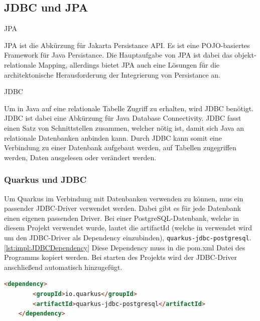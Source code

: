  
\subsection{JDBC und JPA}



\begin{compactitem}
    \item [JPA]
    \item JPA ist die Abkürzung für Jakarta Persistance API. Es ist eine POJO-basiertes Framework für Java Persistance. Die Hauptaufgabe von JPA ist dabei das objekt-relationale Mapping, allerdings bietet JPA auch eine Lösungen für die architektonische Herausforderung der Integrierung von Persistance an. 
    \item [JDBC]
    \item Um in Java auf eine relationale Tabelle Zugriff zu erhalten, wird JDBC benötigt. JDBC ist dabei eine Abkürzung für Java Database Connectivity. JDBC fasst einen Satz von Schnittstellen zusammen, welcher nötig ist, damit sich Java an relationale Datenbanken anbinden kann. Durch JDBC kann somit eine Verbindung zu einer Datenbank aufgebaut werden, auf Tabellen zugegriffen werden, Daten ausgelesen oder verändert werden.  
\end{compactitem}
\cite{quarkusHibernate}

\subsubsection{Quarkus und JDBC}
Um Quarkus im Verbindung mit Datenbanken verwenden zu können, mus ein passender JDBC-Driver verwendet werden. Dabei gibt es für jede Datenbank einen eigenen passenden Driver. Bei einer PostgreSQL-Datenbank, welche in diesem Projekt verwendet wurde, lautet die artifactId (welche in verwendet wird um den JDBC-Driver als Dependency einzubinden), \texttt{quarkus-jdbc-postgresql}. \ref{lst:impl:JDBCDependency} Diese Dependency muss in die pom.xml Datei des Programms kopiert werden. Bei starten des Projekts wird der JDBC-Driver anschließend automatisch hinzugefügt. \cite{quarkusHibernate}
\begin{lstlisting}[language=html,caption=JDBC Dependency,label=lst:impl:JDBCDependency]
    <dependency>
        <groupId>io.quarkus</groupId>
        <artifactId>quarkus-jdbc-postgresql</artifactId>
    </dependency>
  \end{lstlisting}

